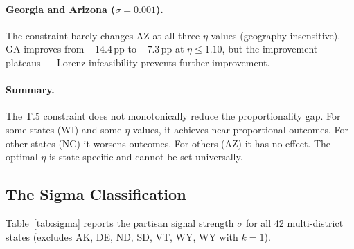 \paragraph{Georgia and Arizona ($\sigma = 0.001$).}
The constraint barely changes AZ at all three $\eta$ values (geography insensitive).
GA improves from $-14.4$\,pp to $-7.3$\,pp at $\eta \leq 1.10$, but the improvement
plateaus --- Lorenz infeasibility prevents further improvement.

\paragraph{Summary.}
The T.5 constraint does not monotonically reduce the proportionality gap.
For some states (WI) and some $\eta$ values, it achieves near-proportional outcomes.
For other states (NC) it worsens outcomes.
For others (AZ) it has no effect.
The optimal $\eta$ is state-specific and cannot be set universally.

\subsection{The Sigma Classification}

Table~\ref{tab:sigma} reports the partisan signal strength $\sigma$ for
all 42 multi-district states (excludes AK, DE, ND, SD, VT, WY, WY with $k=1$).

